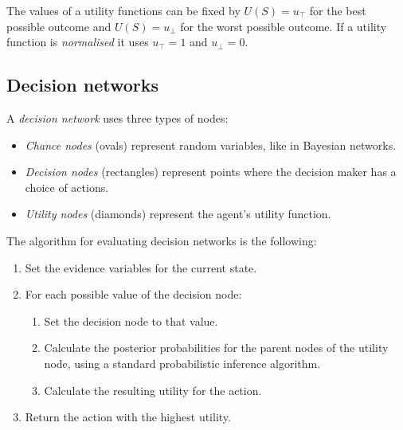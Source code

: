 \documentclass{article}
\begin{document}
\begin{definition}[R\&N p. 615]
    The values of a utility functions can be fixed by $U(S)=u_\top$ for the
    best possible outcome and $U(S)=u_\bot$ for the worst possible outcome.
    If a utility function is \emph{normalised} it uses $u_\top = 1$ and
    $u_\bot = 0$.
\end{definition}

\subsection{Decision networks}

\begin{definition}[R\&N p. 626]
    A \emph{decision network} uses three types of nodes:
    \begin{itemize}
        \item \emph{Chance nodes} (ovals) represent random variables, like in Bayesian networks.
        \item \emph{Decision nodes} (rectangles) represent points where the decision maker
              has a choice of actions.
        \item \emph{Utility nodes} (diamonds) represent the agent's utility function.
    \end{itemize}
\end{definition}

\begin{theorem}[R\&N p. 628]
    The algorithm for evaluating decision networks is the following:
    \begin{enumerate}
        \item Set the evidence variables for the current state.
        \item For each possible value of the decision node: \begin{enumerate}
                  \item Set the decision node to that value.
                  \item Calculate the posterior probabilities for the parent nodes of
                        the utility node, using a standard probabilistic inference algorithm.
                  \item Calculate the resulting utility for the action.
              \end{enumerate}
        \item Return the action with the highest utility.
    \end{enumerate}
\end{theorem}
\end{document}
